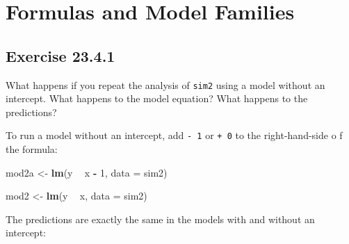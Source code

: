 \documentclass[]{book}
\newenvironment{Shaded}{\begin{snugshade}}{\end{snugshade}}
\newcommand{\CommentTok}[1]{\textcolor[rgb]{0.56,0.35,0.01}{\textit{#1}}}
\newcommand{\DataTypeTok}[1]{\textcolor[rgb]{0.13,0.29,0.53}{#1}}
\newcommand{\DecValTok}[1]{\textcolor[rgb]{0.00,0.00,0.81}{#1}}
\newcommand{\KeywordTok}[1]{\textcolor[rgb]{0.13,0.29,0.53}{\textbf{#1}}}
\newcommand{\NormalTok}[1]{#1}
\newcommand{\OperatorTok}[1]{\textcolor[rgb]{0.81,0.36,0.00}{\textbf{#1}}}
\newcommand{\StringTok}[1]{\textcolor[rgb]{0.31,0.60,0.02}{#1}}
\theoremstyle{plain}
\theoremstyle{remark}
\theoremstyle{definition}
\theoremstyle{definition}
\theoremstyle{definition}
\theoremstyle{remark}
\begin{document}
\hypertarget{formulas-and-model-families}{%
\section{Formulas and Model
Families}\label{formulas-and-model-families}}

\hypertarget{exercise-23.4.1}{%
\subsection*{\texorpdfstring{Exercise
{23.4.1}}{Exercise 23.4.1}}\label{exercise-23.4.1}}

What happens if you repeat the analysis of \texttt{sim2} using a model
without an intercept. What happens to the model equation? What happens
to the predictions?

To run a model without an intercept, add \texttt{-\ 1} or \texttt{+\ 0}
to the right-hand-side o f the formula:

\begin{Shaded}
\begin{Highlighting}[]
\NormalTok{mod2a <-}\StringTok{ }\KeywordTok{lm}\NormalTok{(y }\OperatorTok{~}\StringTok{ }\NormalTok{x }\OperatorTok{-}\StringTok{ }\DecValTok{1}\NormalTok{, }\DataTypeTok{data =}\NormalTok{ sim2)}
\end{Highlighting}
\end{Shaded}

\begin{Shaded}
\begin{Highlighting}[]
\NormalTok{mod2 <-}\StringTok{ }\KeywordTok{lm}\NormalTok{(y }\OperatorTok{~}\StringTok{ }\NormalTok{x, }\DataTypeTok{data =}\NormalTok{ sim2)}
\end{Highlighting}
\end{Shaded}

The predictions are exactly the same in the models with and without an
intercept:

\begin{Shaded}
\end{Shaded}
\end{document}

